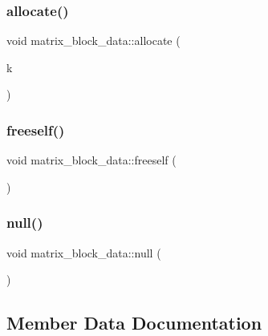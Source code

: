 \subsubsection{\texorpdfstring{allocate()}{allocate()}}
{\footnotesize\ttfamily void matrix\+\_\+block\+\_\+data\+::allocate (\begin{DoxyParamCaption}\item[{\mbox{\hyperlink{galois_8h_a09fddde158a3a20bd2dcadb609de11dc}{I\+NT}}}]{k }\end{DoxyParamCaption})}

\mbox{\label{classmatrix__block__data_ae8df478b90bf9117a0edccdcb3c50c42}} 
\subsubsection{\texorpdfstring{freeself()}{freeself()}}
{\footnotesize\ttfamily void matrix\+\_\+block\+\_\+data\+::freeself (\begin{DoxyParamCaption}{ }\end{DoxyParamCaption})}

\mbox{\label{classmatrix__block__data_a97bb7f0f500960d73c595fd697f64fad}} 
\subsubsection{\texorpdfstring{null()}{null()}}
{\footnotesize\ttfamily void matrix\+\_\+block\+\_\+data\+::null (\begin{DoxyParamCaption}{ }\end{DoxyParamCaption})}



\subsection{Member Data Documentation}
\mbox{\label{classmatrix__block__data_ab73f03d6ab3b15bff91e84c3fb288ccc}} 
